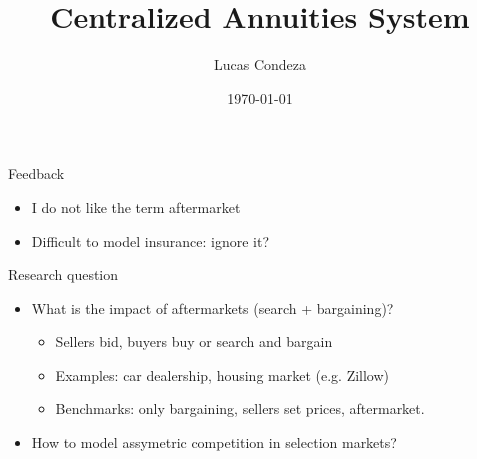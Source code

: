 \documentclass[notes, 10pt,aspectratio=169]{beamer}
\title{Centralized Annuities System}
\author{%
 Lucas Condeza
\inst{1} \and
}
\institute{
  \inst{1} Yale University \\
}
\date{\today}
\begin{document}
\begin{frame}
  \titlepage
\end{frame}

\begin{frame}{Feedback}

\begin{itemize}
    \item I do not like the term aftermarket 
    \item Difficult to model insurance: ignore it?  
\end{itemize}

    
\end{frame}

\begin{frame}{Research question}
    
\begin{itemize}
    
    \item What is the impact of aftermarkets (search + bargaining)? 

    \begin{itemize}

    \item Sellers bid, buyers buy or search and bargain 
    
    \item Examples: car dealership, housing market (e.g. Zillow) 

    \item Benchmarks: only bargaining, sellers set prices, aftermarket. 
    
    \end{itemize}

    \item How to model assymetric competition in selection markets? 
\end{itemize}
\end{frame}
\end{document}
